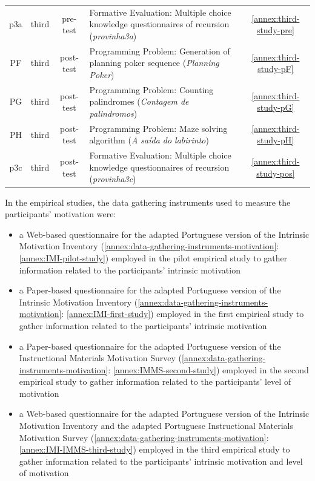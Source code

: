 {\begin{longtable}{cccp{9cm}c}
p3a&third&pre-test&
Formative Evaluation: Multiple choice knowledge questionnaires of recursion (\emph{provinha3a})&
\autoref{annex:third-study-pre}\tabularnewline

PF&third&post-test&
Programming Problem: Generation of planning poker sequence (\emph{Planning Poker})&
\autoref{annex:third-study-pF}\tabularnewline

PG&third&post-test&
Programming Problem: Counting palindromes (\emph{Contagem de palindromos})&
\autoref{annex:third-study-pG}\tabularnewline

PH&third&post-test&
Programming Problem: Maze solving algorithm (\emph{A saída do labirinto})&
\autoref{annex:third-study-pH}\tabularnewline

p3c&third&post-test&
Formative Evaluation: Multiple choice knowledge questionnaires of recursion (\emph{provinha3c})&
\autoref{annex:third-study-pos}\tabularnewline

\hline
\end{longtable}}

In the empirical studies, the data gathering instruments used to measure the participants' motivation were:
\begin{itemize}
\item
a Web-based questionnaire for the adapted Portuguese version of the Intrinsic Motivation Inventory (\autoref{annex:data-gathering-instruments-motivation}: \autoref{annex:IMI-pilot-study}) employed in the pilot empirical study to gather information related to the participants' intrinsic motivation
\item
a Paper-based questionnaire for the adapted Portuguese version of the Intrinsic Motivation Inventory (\autoref{annex:data-gathering-instruments-motivation}: \autoref{annex:IMI-first-study}) employed in the first empirical study to gather information related to the participants' intrinsic motivation
\item
a Paper-based questionnaire for the adapted Portuguese version of the Instructional Materials Motivation Survey (\autoref{annex:data-gathering-instruments-motivation}: \autoref{annex:IMMS-second-study}) employed in the second empirical study to gather information related to the participants' level of motivation
\item
a Web-based questionnaire for the adapted Portuguese version of the Intrinsic Motivation Inventory and the adapted Portuguese Instructional Materials Motivation Survey (\autoref{annex:data-gathering-instruments-motivation}: \autoref{annex:IMI-IMMS-third-study}) employed in the third empirical study to gather information related to the participants' intrinsic motivation and level of motivation
\end{itemize}

